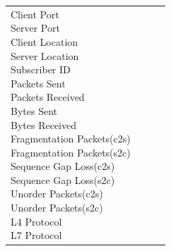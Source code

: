 \begin{description}
\begin{longtable}{p{}|p{}|p{}|p{}}
{                                                                                                    Client Port\\
                                                                                                    Server Port\\
                                                                                                    Client Location\\
                                                                                                    Server Location\\
                                                                                                    Subscriber ID\\
                                                                                                    Packets Sent\\
                                                                                                    Packets Received\\
                                                                                                    Bytes Sent\\
                                                                                                    Bytes Received\\
                                                                                                    Fragmentation Packets(c2s)\\
                                                                                                    Fragmentation Packets(s2c)\\
                                                                                                    Sequence Gap Loss(c2s)\\
                                                                                                    Sequence Gap Loss(s2c)\\
                                                                                                    Unorder Packets(c2s)\\
                                                                                                    Unorder Packets(s2c)\\
                                                                                                    L4 Protocol\\
                                                                                                    L7 Protocol\\
}
\end{longtable}
\end{description}
